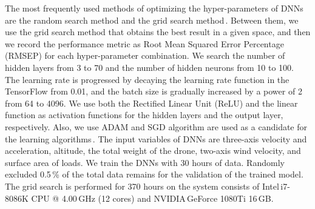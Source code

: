 \documentclass[journal]{./template/IEEEtran}
\begin{document}
The most frequently used methods of optimizing the hyper-parameters of DNNs are the random search method and the grid search method\,\cite{ref_16}. 
Between them, we use the grid search method that obtains the best result in a given space, and then we record the performance metric as Root Mean Squared Error Percentage (RMSEP) for each hyper-parameter combination.
We search the number of hidden layers from 3 to 70 and the number of hidden neurons from 10 to 100. 
The learning rate is progressed by decaying the learning rate function in the TensorFlow from 0.01, and the batch size is gradually increased by a power of 2 from 64 to 4096.
We use both the Rectified Linear Unit (ReLU) and the linear function as activation functions for the hidden layers and the output layer, respectively. 
Also, we use ADAM and SGD algorithm are used as a candidate for the learning algorithms\,\cite{ref_17}. 
The input variables of DNNs are three-axis velocity and acceleration, altitude, the total weight of the drone, two-axis wind velocity, and surface area of loads. 
We train the DNNs with 30 hours of data. Randomly excluded 0.5\,\% of the total data remains for the validation of the trained model.
The grid search is performed for 370 hours on the system consists of Intel\textregistered \,i7-8086K CPU @ 4.00\,GHz (12 cores) and NVIDIA\textregistered \,GeForce 1080Ti 16\,GB.
\end{document}
